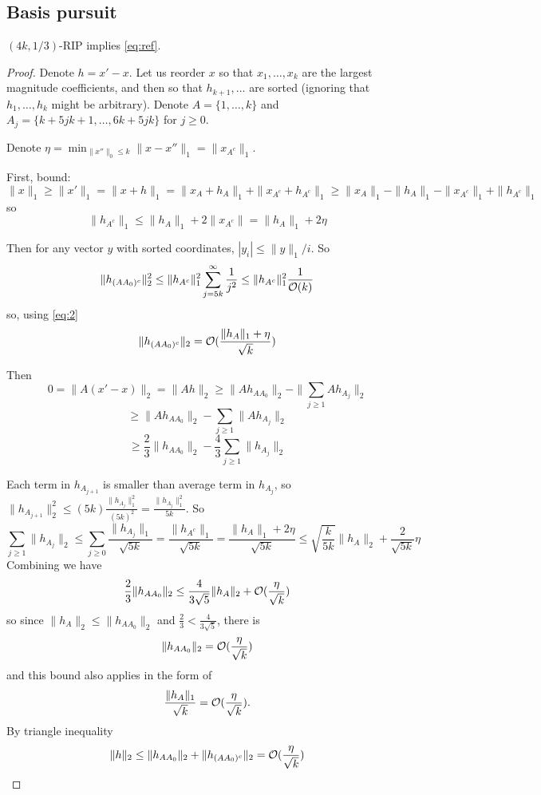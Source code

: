 \documentclass[11pt]{article}
\begin{document}
\subsection{Basis pursuit}
\begin{theorem}
$(4k,1/3)$-RIP implies \eqref{eq:ref}.
\end{theorem}
\begin{proof}
Denote $h = x'-x$. Let us reorder $x$ so that $x_1,\ldots,x_k$ are the largest magnitude coefficients, and then so that $h_{k+1},\ldots$ are sorted (ignoring that $h_1,\ldots,h_k$ might be arbitrary). Denote $A = \{1,\ldots,k\}$ and $A_j = \{k+5jk+1,\ldots,6k+5jk\}$ for $j \ge 0$.

Denote $\eta = \min_{\|x''\|_0 \le k} \|x - x''\|_1 = \|x_{A^c}\|_1$.

First, bound:
$$\|x\|_1 \ge \|x'\|_1 = \|x + h\|_1 = \|x_A+h_A\|_1 + \|x_{A^c} + h_{A^c}\|_1 \ge \|x_A\|_1 - \|h_A\|_1 - \|x_{A^c}\|_1 + \|h_{A^c}\|_1$$
so
\begin{equation}
\label{eq:2}
\|h_{A^c}\|_1 \le \|h_{A}\|_1 + 2 \|x_{A^c}\| = \|h_{A}\|_1 + 2 \eta
\end{equation}

Then for any vector $y$ with sorted coordinates, $|y_i| \le \|y\|_1/i$. So
$$
\|h_{(AA_0)^c}\|_2^2 \le \|h_{A^c}\|_1^2 \sum_{j=5k}^{\infty} \frac{1}{j^2} \le  \|h_{A^c}\|_1^2 \frac{1}{\mathcal{O}(k)}
$$
so, using \eqref{eq:2}
\begin{equation}
\|h_{(AA_0)^c}\|_2 = \mathcal{O}(\frac{\|h_{A}\|_1 + \eta}{\sqrt{k}})
\end{equation}

Then
$$0 = \|A(x'-x)\|_2 = \|Ah\|_2 \ge \|A h_{AA_0}\|_2 - \|\sum_{j\ge1} A h_{A_j} \|_2$$
$$ \ge  \|A h_{AA_0}\|_2 - \sum_{j\ge1} \|A h_{A_j} \|_2$$
$$\ge \frac23  \|h_{AA_0}\|_2 - \frac43\sum_{j\ge1} \| h_{A_j} \|_2$$

Each term in $h_{A_{j+1}}$ is smaller than average term in $h_{A_j}$, so $\|h_{A_{j+1}}\|_2^2 \le (5k) \frac{\|h_{A_j}\|_1^2}{(5k)^2} =  \frac{\|h_{A_j}\|_1^2}{5k}$. So
\begin{equation}
\label{eq:4}
\sum_{j\ge1} \| h_{A_j} \|_2 \le \sum_{j \ge 0} \frac{\|h_{A_j}\|_1}{\sqrt{5k}} = \frac{\|h_{A^c}\|_1}{\sqrt{5k}} =  \frac{\|h_{A}\|_1 + 2\eta}{\sqrt{5k}} \le \sqrt{\frac{k}{5k}} \|h_{A}\|_2 + \frac{2}{\sqrt{5k}} \eta
\end{equation}
Combining we have
$$  \frac{2}{3} \|h_{AA_0}\|_2 \le \frac{4}{3 \sqrt{5}} \|h_A\|_2 + \mathcal{O}(\frac{\eta}{\sqrt{k}})$$
so since $\|h_A\|_2 \le \|h_{AA_0}\|_2$ and $\frac{2}{3} < \frac{4}{3 \sqrt{5}}$, there is
$$ \|h_{AA_0}\|_2 = \mathcal{O}(\frac{\eta}{\sqrt{k}})$$
and this bound also applies in the form of
$$\frac{\|h_{A}\|_1 }{\sqrt{k}} = \mathcal{O}(\frac{\eta}{\sqrt{k}}).$$
By triangle inequality
$$\|h\|_2 \le \|h_{AA_0}\|_2 + \|h_{(AA_0)^c}\|_2 =  \mathcal{O}(\frac{\eta}{\sqrt{k}})$$
\end{proof}
\end{document}
